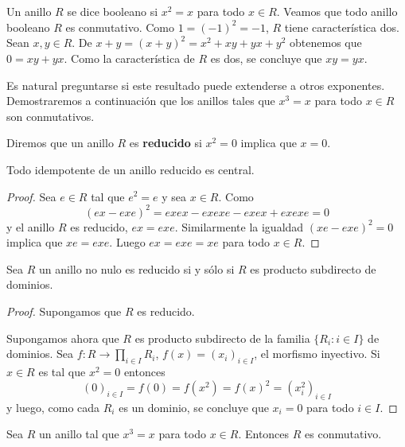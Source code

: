 \chapter{}


Un anillo $R$ se dice booleano si $x^2=x$ para todo $x\in R$. Veamos que todo
anillo booleano $R$ es conmutativo.  Como $1=(-1)^2=-1$, $R$ tiene
característica dos. Sean $x,y\in R$. De $x+y=(x+y)^2=x^2+xy+yx+y^2$ obtenemos
que $0=xy+yx$. Como la característica de $R$ es dos, se concluye que $xy=yx$.

\medskip
Es natural preguntarse si este resultado puede extenderse a otros exponentes.
Demostraremos a continuación  que los anillos tales que $x^3=x$ para todo $x\in
R$ son conmutativos.

\begin{definition}
	Diremos que un anillo $R$ es \textbf{reducido} si $x^2=0$ implica que $x=0$. 
\end{definition}

\begin{lemma}
	\label{lem:reducido}
	Todo idempotente de un anillo reducido es central.
\end{lemma}

\begin{proof}
	Sea $e\in R$ tal que $e^2=e$ y sea $x\in R$. Como
	\[
	(ex-exe)^2=exex-exexe-exex+exexe=0
	\]
	y el anillo $R$ es reducido, $ex=exe$. 
	Similarmente la igualdad 
	$(xe-exe)^2=0$ implica que $xe=exe$. Luego $ex=exe=xe$ para todo $x\in R$.
\end{proof}

\begin{theorem}
	Sea $R$ un anillo no nulo es reducido si y sólo si $R$ es producto
	subdirecto de dominios.
\end{theorem}

\begin{proof}
	Supongamos que $R$ es reducido.

	Supongamos ahora que $R$ es producto subdirecto de la familia $\{R_i:i\in I\}$ de dominios. Sea 
	$f\colon R\to \prod_{i\in I}R_i$, $f(x)=(x_i)_{i\in I}$, el morfismo inyectivo. 
	Si $x\in R$ es tal que $x^2=0$ entonces 
	\[
		(0)_{i\in I}=f(0)=f(x^2)=f(x)^2=(x_i^2)_{i\in I}
	\]
	y luego, como cada $R_i$ es un dominio, se concluye que $x_i=0$ para todo
	$i\in I$.
\end{proof}

\begin{proposition}
	Sea $R$ un anillo tal que $x^3=x$ para todo $x\in R$. Entonces $R$ es
	conmutativo.
\end{proposition}


